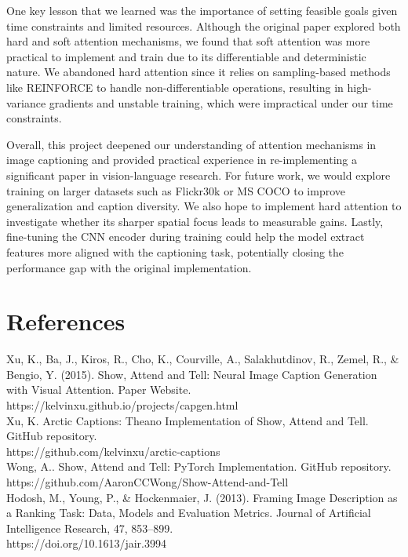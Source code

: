 \documentclass{article}
\begin{document}
One key lesson that we learned was the importance of setting feasible goals given time constraints and limited resources. Although the original paper explored both hard and soft attention mechanisms, we found that soft attention was more practical to implement and train due to its differentiable and deterministic nature. We abandoned hard attention since it relies on sampling-based methods like REINFORCE to handle non-differentiable operations, resulting in high-variance gradients and unstable training, which were impractical under our time constraints.

Overall, this project deepened our understanding of attention mechanisms in image captioning and provided practical experience in re-implementing a significant paper in vision-language research. For future work, we would explore training on larger datasets such as Flickr30k or MS COCO to improve generalization and caption diversity. We also hope to implement hard attention to investigate whether its sharper spatial focus leads to measurable gains. Lastly, fine-tuning the CNN encoder during training could help the model extract features more aligned with the captioning task, potentially closing the performance gap with the original implementation.


\section{References}
\noindent
[1] Xu, K., Ba, J., Kiros, R., Cho, K., Courville, A., Salakhutdinov, R., Zemel, R., \& Bengio, Y. (2015). Show, Attend and Tell: Neural Image Caption Generation with Visual Attention. Paper Website. \\ https://kelvinxu.github.io/projects/capgen.html\\

\noindent
[2] Xu, K. Arctic Captions: Theano Implementation of Show, Attend and Tell. GitHub repository. \\ https://github.com/kelvinxu/arctic-captions\\

\noindent
[3] Wong, A.. Show, Attend and Tell: PyTorch Implementation. GitHub repository. \\ https://github.com/AaronCCWong/Show-Attend-and-Tell\\

\noindent
[4] Hodosh, M., Young, P., \& Hockenmaier, J. (2013). Framing Image Description as a Ranking Task: Data, Models and Evaluation Metrics. Journal of Artificial Intelligence Research, 47, 853–899.\\ https://doi.org/10.1613/jair.3994\\
\end{document}
